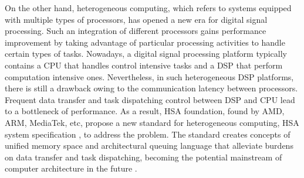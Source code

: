 \documentclass[12pt]{article}
\begin{document}
\begin{CJK}{UTF8}{bkai}
        On the other hand, heterogeneous computing, which refers to systems equipped with multiple types of processors, has opened a new era for digital signal processing. 
        Such an integration of different processors gains performance improvement by taking advantage of particular processing activities to handle certain types of tasks.
        Nowadays, a digital signal processing platform typically contains a CPU that handles control intensive tasks and a DSP that perform computation intensive ones.
        Nevertheless, in such heterogeneous DSP platforms, there is still a drawback owing to the communication latency between processors. 
        Frequent data transfer and task dispatching control between DSP and CPU lead to a  bottleneck of performance. 
        As a result, HSA foundation, found by AMD, ARM, MediaTek, etc, propose a new standard for heterogeneous computing, HSA system specification \cite{systemspec}, to address the problem. 
        The standard creates concepts of unified memory space and architectural queuing language that alleviate burdens on data transfer and task dispatching, becoming the potential mainstream of computer architecture in the future \cite{mainstream}.


\end{CJK}
\end{document}
